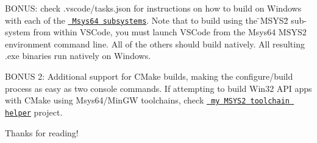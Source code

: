 BONUS\+: check \textquotesingle{}.vscode/tasks.\+json\textquotesingle{} for instructions on how to build on Windows with each of the \href{https://www.msys2.org/docs/environments/}{\texttt{ Msys64 subsystems}}. Note that to build using the \"{}\+MSYS2\"{} sub-\/system from within VSCode, you must launch VSCode from the Msys64 MSYS2 environment command line. All of the others should build natively. All resulting \textquotesingle{}.exe\textquotesingle{} binaries run natively on Windows.

BONUS 2\+: Additional support for CMake builds, making the configure/build process as easy as two console commands. If attempting to build Win32 API apps with CMake using Msys64/\+Min\+GW toolchains, check \href{https://github.com/StoneyDSP/msys2-toolchain.git}{\texttt{ my MSYS2 toolchain helper}} project.

Thanks for reading! 